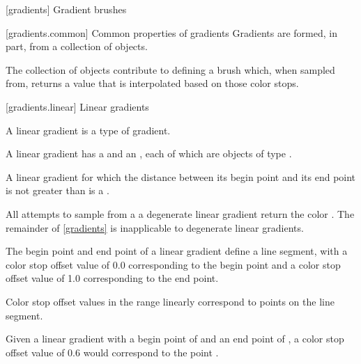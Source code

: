  [gradients] {Gradient brushes}

 [gradients.common] {Common properties of gradients}
\pnum
Gradients are formed, in part, from a collection of  objects.

\pnum
The collection of  objects contribute to defining a brush which, when sampled from, returns a value that is interpolated based on those color stops.

 [gradients.linear] {Linear gradients}

\pnum
A linear gradient is a type of gradient.

\pnum
A linear gradient has a  and an , each of which are objects of type .

\pnum
A linear gradient for which the distance between its begin point and its end point is not greater than  is a .

\pnum
All attempts to sample from a a degenerate linear gradient return the color . The remainder of \ref{gradients} is inapplicable to degenerate linear gradients.

\pnum
The begin point and end point of a linear gradient define a line segment, with a color stop offset value of 0.0 corresponding to the begin point and a color stop offset value of 1.0 corresponding to the end point.

\pnum
Color stop offset values in the range  linearly correspond to points on the line segment.

\pnum
\enterexample
Given a linear gradient with a begin point of  and an end point of , a color stop offset value of 0.6 would correspond to the point .
\exitexample

